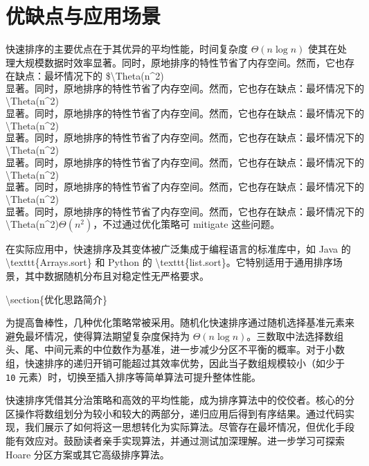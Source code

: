 \chapter{优缺点与应用场景}
快速排序的主要优点在于其优异的平均性能，时间复杂度 $\Theta(n \log{n})$ 使其在处理大规模数据时效率显著。同时，原地排序的特性节省了内存空间。然而，它也存在缺点：最坏情况下的 \${}\textbackslash{}Theta(n\^{}2)$显著。同时，原地排序的特性节省了内存空间。然而，它也存在缺点：最坏情况下的 $\textbackslash{}Theta(n\^{}2)$显著。同时，原地排序的特性节省了内存空间。然而，它也存在缺点：最坏情况下的 $\textbackslash{}Theta(n\^{}2)$显著。同时，原地排序的特性节省了内存空间。然而，它也存在缺点：最坏情况下的 $\textbackslash{}Theta(n\^{}2)$显著。同时，原地排序的特性节省了内存空间。然而，它也存在缺点：最坏情况下的 $\textbackslash{}Theta(n\^{}2)$显著。同时，原地排序的特性节省了内存空间。然而，它也存在缺点：最坏情况下的 $\textbackslash{}Theta(n\^{}2)$显著。同时，原地排序的特性节省了内存空间。然而，它也存在缺点：最坏情况下的 $\textbackslash{}Theta(n\^{}2)$\Theta(n^2)$，不过通过优化策略可 mitigate 这些问题。\par
在实际应用中，快速排序及其变体被广泛集成于编程语言的标准库中，如 Java 的 \textbackslash{}texttt\{{}Arrays.sort\}{} 和 Python 的 \textbackslash{}texttt\{{}list.sort\}{}。它特别适用于通用排序场景，其中数据随机分布且对稳定性无严格要求。\par
\textbackslash{}section\{{}优化思路简介\}{}\par
为提高鲁棒性，几种优化策略常被采用。随机化快速排序通过随机选择基准元素来避免最坏情况，使得算法期望复杂度保持为 $\Theta(n \log n)$。三数取中法选择数组头、尾、中间元素的中位数作为基准，进一步减少分区不平衡的概率。对于小数组，快速排序的递归开销可能超过其效率优势，因此当子数组规模较小（如少于 \texttt{10} 元素）时，切换至插入排序等简单算法可提升整体性能。\par
快速排序凭借其分治策略和高效的平均性能，成为排序算法中的佼佼者。核心的分区操作将数组划分为较小和较大的两部分，递归应用后得到有序结果。通过代码实现，我们展示了如何将这一思想转化为实际算法。尽管存在最坏情况，但优化手段能有效应对。鼓励读者亲手实现算法，并通过测试加深理解。进一步学习可探索 Hoare 分区方案或其它高级排序算法。\par

